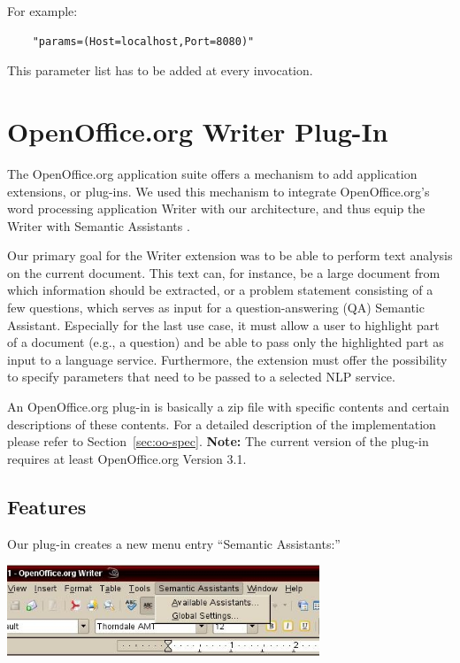 For example:
\begin{verbatim}
    "params=(Host=localhost,Port=8080)"
\end{verbatim}

This parameter list has to be added at every invocation.

\section{OpenOffice.org Writer Plug-In}
The OpenOffice.org application suite offers a mechanism
to add application extensions, or plug-ins. We used this
mechanism to integrate OpenOffice.org's word processing
application Writer with our architecture, and thus equip the
Writer with Semantic Assistants \citep{giwi08}.

Our primary goal for the Writer extension was to be able
to perform text analysis on the current document. This
text can, for instance, be a large document from which
information should be extracted, or a problem statement
consisting of a few questions, which serves as input for a
question-answering (QA) Semantic Assistant. Especially
for the last use case, it must allow a user to highlight part of
a document (e.g., a question) and be able to pass only the
highlighted part as input to a language service. Furthermore,
the extension must offer the possibility to specify parameters
that need to be passed to a selected NLP service.

An OpenOffice.org plug-in is basically a zip file with specific
contents and certain descriptions of these contents.  For a detailed
description of the implementation please refer to
Section~\ref{sec:oo-spec}. \textbf{Note:} The current version of the
plug-in requires at least OpenOffice.org Version 3.1.


\subsection{Features}
Our plug-in creates a new menu entry ``Semantic Assistants:''
\begin{center}
\includegraphics[width=0.7\textwidth]{pictures/oomenu.jpg}
\end{center}

